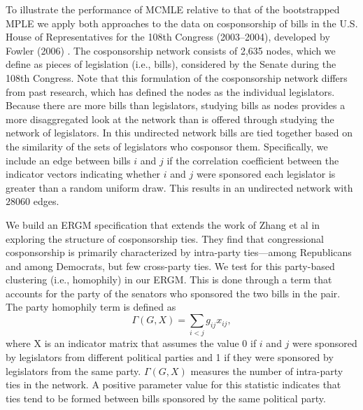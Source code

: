 \documentclass{llncs}
\begin{document}
To illustrate the performance of MCMLE relative to that of the bootstrapped MPLE we apply both approaches to the data on cosponsorship of bills in the U.S. House of Representatives for the 108th Congress (2003--2004), developed by Fowler (2006) \cite{Fowler2006a} \cite{Fowler2006b}. The cosponsorship network consists of 2,635 nodes, which we define as pieces of legislation (i.e., bills), considered by the Senate during the 108th Congress. Note that this formulation of the cosponsorship network differs from past research, which has defined the nodes as the individual legislators. Because there are more bills than legislators, studying bills as nodes provides a more disaggregated look at the network than is offered through studying the network of legislators. In this undirected network bills are tied together based on the similarity of the sets of legislators who cosponsor them. Specifically, we include an edge between bills $i$ and $j$ if the correlation coefficient between the indicator vectors indicating whether $i$ and $j$ were sponsored each legislator is greater than a random uniform draw. This results in an undirected network with $28060$ edges.

We build an ERGM specification that extends the work of  Zhang et al\cite{zhang2008community} in exploring the structure of cosponsorship ties. They find that congressional cosponsorship is primarily characterized by intra-party ties---among Republicans and among Democrats, but few cross-party ties. We test for this party-based clustering (i.e., homophily) in our ERGM. This is done through a term that accounts for the party of the senators who sponsored the two bills in the pair. The party homophily term is defined as $$ \Gamma(G,X) = \sum_{i < j} g_{ij}x_{ij},$$ where X is an indicator matrix that assumes the value 0 if $i$ and $j$ were sponsored by legislators from different political parties and 1 if they were sponsored by legislators from the same party.  $\Gamma(G,X)$ measures the number of intra-party ties in the network. A positive parameter value for this statistic indicates that ties tend to be formed between bills sponsored by the same political party.
\end{document}
